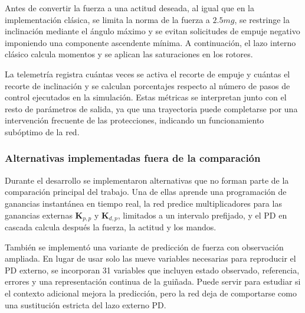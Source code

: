 Antes de convertir la fuerza a una actitud deseada, al igual que en la implementación
clásica, se limita la norma de la fuerza a $2.5mg$, se restringe la inclinación mediante el ángulo máximo y se evitan solicitudes de empuje negativo imponiendo una componente
ascendente mínima. A continuación, el lazo interno clásico calcula momentos y se aplican las
saturaciones en los rotores.

La telemetría registra cuántas veces se activa el recorte de empuje y cuántas el
recorte de inclinación y se calculan porcentajes respecto al número de pasos de control
ejecutados en la simulación. Estas métricas se interpretan junto con el resto de parámetros
de salida, ya que una trayectoria puede
completarse por una intervención frecuente de las protecciones, indicando un funcionamiento
subóptimo de la red.

\subsubsection*{Alternativas implementadas fuera de la comparación}

Durante el desarrollo se implementaron alternativas que no forman parte de la
comparación principal del trabajo. Una de ellas aprende una programación de ganancias
instantánea en tiempo real, la red predice multiplicadores para las ganancias externas
$\bm{K}_{p,p}$ y $\bm{K}_{d,p}$, limitados a un intervalo prefijado, y el PD en
cascada calcula después la fuerza, la actitud y los mandos.

También se implementó una variante de predicción de fuerza con observación
ampliada. En lugar de usar solo las nueve variables necesarias para reproducir
el PD externo, se incorporan 31 variables que incluyen estado observado,
referencia, errores y una representación continua de la guiñada. Puede servir
para estudiar si el contexto adicional mejora la predicción, pero la red deja de comportarse como una sustitución estricta del lazo externo PD.

